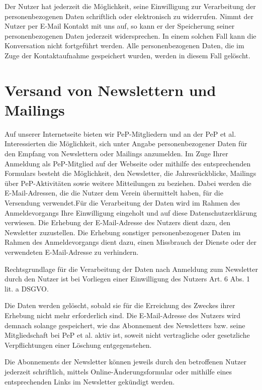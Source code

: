\documentclass[
  fontsize=12pt,
  paper=a4,
  DIV14,
  parskip,
]{scrartcl}
\begin{document}
Der Nutzer hat jederzeit die Möglichkeit, seine Einwilligung zur Verarbeitung
der personenbezogenen Daten schriftlich oder elektronisch zu widerrufen.
Nimmt der Nutzer per E-Mail Kontakt mit uns auf, so kann er der Speicherung
seiner personenbezogenen Daten jederzeit widersprechen.
In einem solchen Fall kann die Konversation nicht fortgeführt werden.
Alle personenbezogenen Daten, die im Zuge der Kontaktaufnahme gespeichert
wurden, werden in diesem Fall gelöscht.

\section{Versand von Newslettern und Mailings}

Auf unserer Internetseite bieten wir PeP-Mitgliedern und an der PeP et al.
Interessierten die Möglichkeit, sich unter Angabe personenbezogener Daten für
den Empfang von Newslettern oder Mailings anzumelden.
Im Zuge Ihrer Anmeldung als PeP-Mitglied auf der Webseite oder mithilfe des
entsprechenden Formulars besteht die Möglichkeit, den Newsletter, die
Jahresrückblicke, Mailings über PeP-Aktivitäten sowie weitere Mitteilungen zu
beziehen.
Dabei werden die E-Mail-Adressen, die die Nutzer dem Verein übermittelt
haben, für die Versendung verwendet.Für die Verarbeitung der Daten wird im
Rahmen des Anmeldevorgangs Ihre Einwilligung eingeholt und auf diese
Datenschutzerklärung verwiesen.
Die Erhebung der E-Mail-Adresse des Nutzers dient dazu, den Newsletter
zuzustellen. Die Erhebung sonstiger personenbezogener Daten im Rahmen des
Anmeldevorgangs dient dazu, einen Missbrauch der Dienste oder der verwendeten
E-Mail-Adresse zu verhindern.

Rechtsgrundlage für die Verarbeitung der Daten nach Anmeldung zum Newsletter
durch den Nutzer ist bei Vorliegen einer Einwilligung des Nutzers Art. 6 Abs.
1 lit. a DSGVO.

Die Daten werden gelöscht, sobald sie für die Erreichung des Zweckes ihrer
Erhebung nicht mehr erforderlich sind. Die E-Mail-Adresse des Nutzers wird
demnach solange gespeichert, wie das Abonnement des Newsletters bzw. seine
Mitgliedschaft bei PeP et al. aktiv ist, soweit nicht vertragliche oder
gesetzliche Verpflichtungen einer Löschung entgegenstehen.

Die Abonnements der Newsletter können jeweils durch den betroffenen Nutzer
jederzeit schriftlich, mittels Online-Änderungsformular oder mithilfe eines entsprechenden Links im Newsletter gekündigt werden.
\end{document}
